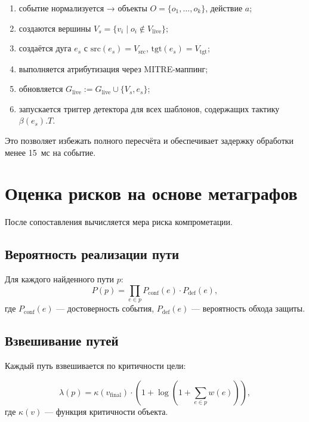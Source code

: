 \noindent
\begin{enumerate}
    \item событие нормализуется → объекты $O = \{o_1, ..., o_k\}$, действие $a$;
    \item создаются вершины $V_s = \{v_i \mid o_i \notin V_{\text{live}}\}$;
    \item создаётся дуга $e_s$ с $\text{src}(e_s) = V_{\text{src}}$, $\text{tgt}(e_s) = V_{\text{tgt}}$;
    \item выполняется атрибутизация через MITRE-маппинг;
    \item обновляется $G_{\text{live}} := G_{\text{live}} \cup \{V_s, e_s\}$;
    \item запускается триггер детектора для всех шаблонов, содержащих тактику $\beta(e_s).T$.
\end{enumerate}

Это позволяет избежать полного пересчёта и обеспечивает задержку обработки менее 15~мс на событие.

\section{Оценка рисков на основе метаграфов}\label{sec:ch3/sect5}

После сопоставления вычисляется мера риска компрометации.

\subsection{Вероятность реализации пути}

Для каждого найденного пути $p$:
\begin{equation}
    P(p) = \prod_{e \in p} P_{\text{conf}}(e) \cdot P_{\text{def}}(e),
    \label{eq:path_prob}
\end{equation}
где $P_{\text{conf}}(e)$ — достоверность события, $P_{\text{def}}(e)$ — вероятность обхода защиты.

\subsection{Взвешивание путей}

Каждый путь взвешивается по критичности цели:

\begin{equation}
    \lambda(p) = \kappa(v_{\text{final}}) \cdot \left(1 + \log \left(1 + \sum_{e \in p} w(e)\right)\right),
    \label{eq:path_weight}
\end{equation}
где $\kappa(v)$ — функция критичности объекта.

